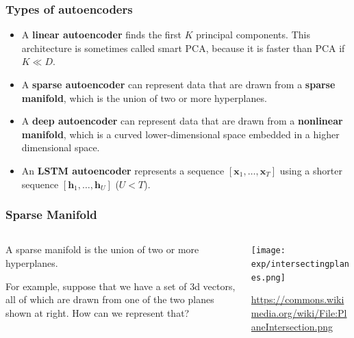 \documentclass{beamer}
\begin{document}
\begin{frame}
  \frametitle{Types of autoencoders}

  \begin{itemize}
  \item A \textbf{linear autoencoder} finds the first $K$ principal
    components.  This architecture is sometimes called smart PCA,
    because it is faster than PCA if $K\ll D$.
  \item A \textbf{sparse autoencoder} can represent data that are
    drawn from a \textbf{sparse manifold}, which is the union of two
    or more hyperplanes.
  \item A \textbf{deep autoencoder} can represent data that are drawn
    from a \textbf{nonlinear manifold}, which is a curved
    lower-dimensional space embedded in a higher dimensional space.
  \item An \textbf{LSTM autoencoder} represents a sequence
    $[\bm{x}_1,\ldots,\bm{x}_T]$ using a shorter sequence
    $[\bm{h}_1,\ldots,\bm{h}_U]$ ($U<T$).
  \end{itemize}
\end{frame}

\begin{frame}
  \frametitle{Sparse Manifold}
  \begin{columns}
    \begin{column}{0.5\textwidth}
      A sparse manifold is the union of two or more hyperplanes.

      For example, suppose that we have a set of 3d vectors, all of
      which are drawn from one of the two planes shown at right.  How
      can we represent that?
    \end{column}
    \begin{column}{0.5\textwidth}
      \texttt{[image: exp/intersectingplanes.png]}

      \url{https://commons.wikimedia.org/wiki/File:PlaneIntersection.png}
    \end{column}
  \end{columns}
\end{frame}
\end{document}
